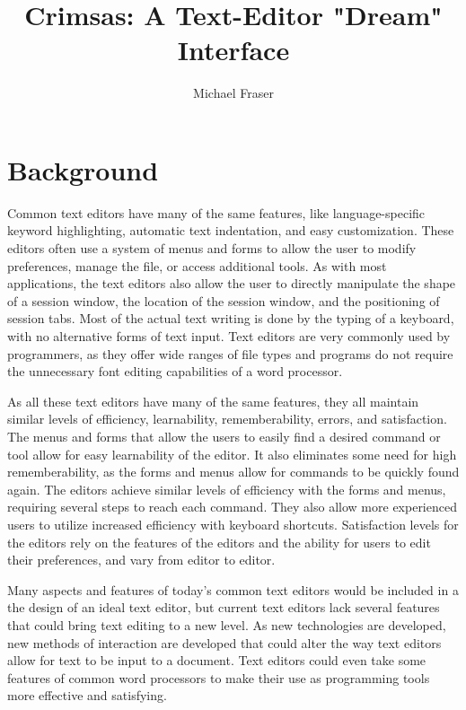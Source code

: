 \documentclass[11pt, oneside]{article}
\begin{document}
\title{Crimsas: A Text-Editor "Dream" Interface}
\author{Michael Fraser}
\maketitle

\tableofcontents

\section{Background}
Common text editors have many of the same features, like language-specific keyword highlighting, automatic text indentation, and easy customization. These editors often use a system of menus and forms to allow the user to modify preferences, manage the file, or access additional tools. As with most applications, the text editors also allow the user to directly manipulate the shape of a session window, the location of the session window, and the positioning of session tabs. Most of the actual text writing is done by the typing of a keyboard, with no alternative forms of text input. Text editors are very commonly used by programmers, as they offer wide ranges of file types and programs do not require the unnecessary font editing capabilities of a word processor.

As all these text editors have many of the same features, they all maintain similar levels of efficiency, learnability, rememberability, errors, and satisfaction. The menus and forms that allow the users to easily find a desired command or tool allow for easy learnability of the editor. It also eliminates some need for high rememberability, as the forms and menus allow for commands to be quickly found again. The editors achieve similar levels of efficiency with the forms and menus, requiring several steps to reach each command. They also allow more experienced users to utilize increased efficiency with keyboard shortcuts. Satisfaction levels for the editors rely on the features of the editors and the ability for users to edit their preferences, and vary from editor to editor. %

Many aspects and features of today's common text editors would be included in a the design of an ideal text editor, but current text editors lack several features that could bring text editing to a new level. As new technologies are developed, new methods of interaction are developed that could alter the way text editors allow for text to be input to a document. Text editors could even take some features of common word processors to make their use as programming tools more effective and satisfying. 
\end{document}
